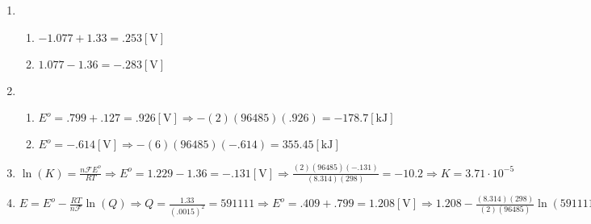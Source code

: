 \documentclass[12pt]{article}
\begin{document}
\begin{enumerate}
\begin{enumerate}
    \end{enumerate}

  \item

    \begin{enumerate}

      \item $-1.077+1.33=.253[\si{\volt}]$

      \item $1.077-1.36=-.283[\si{\volt}]$

    \end{enumerate}

  \item

    \begin{enumerate}

      \item $E^o=.799+.127=.926[\si{\volt}]\Rightarrow -(2)(96485)(.926)=-178.7[\si{\kilo\joule}]$

      \item $E^o=-.614[\si{\volt}]\Rightarrow -(6)(96485)(-.614)=355.45[\si{\kilo\joule}]$

    \end{enumerate}

  \item $\ln(K)=\frac{n\mathcal{F}E^o}{RT}\Rightarrow E^o=1.229-1.36=-.131[\si{\volt}]\Rightarrow \frac{(2)(96485)(-.131)}{(8.314)(298)}=-10.2\Rightarrow K=3.71\cdot10^{-5}$

  \item $E=E^o-\frac{RT}{n\mathcal{F}}\ln(Q)\Rightarrow Q=\frac{1.33}{(.0015)^2}=591111\Rightarrow E^o=.409+.799=1.208[\si{\volt}]\Rightarrow 1.208-\frac{(8.314)(298)}{(2)(96485)}\ln(591111)=1.037[\si{\volt}]$

\end{enumerate}
\end{document}
